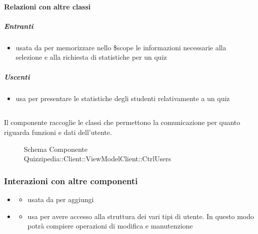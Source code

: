 \paragraph{Relazioni con altre classi}
\subparagraph{Entranti}
\begin{itemize}
\item usata da  per memorizzare nello \$scope le informazioni necessarie alla selezione e alla richiesta di statistiche per un quiz
\end{itemize}
\subparagraph{Uscenti}
\begin{itemize}
\item usa  per presentare le statistiche degli studenti relativamente a un quiz
\end{itemize}
\subsection{}
Il componente raccoglie le classi che permettono la comunicazione per quanto riguarda funzioni e dati dell'utente.
\begin{figure}[H]
\centering
\noindent{}
\caption[Schema Componente Quizzipedia::Client::ViewModelClient::CtrlUsers]{Schema Componente Quizzipedia::Client::ViewModelClient::CtrlUsers}
\end{figure}
\subsubsection{Interazioni con altre componenti}
\begin{itemize}
\item {}
\begin{itemize}
\item usata da  per aggiungi
\end{itemize}
\item {}
\begin{itemize}
\item usa  per avere accesso alla struttura dei vari tipi di utente. In questo modo potrà compiere operazioni di modifica e manutenzione
\end{itemize}
\end{itemize}
